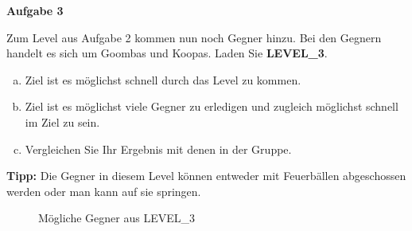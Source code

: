 \documentclass[a4paper,12pt]{article}
\newcommand{\Aufgabe}[1]{
  {
  \textsf{\textbf{Aufgabe #1}}
  
  }
}
\begin{document}
\Aufgabe{3}
Zum Level aus Aufgabe 2 kommen nun noch Gegner hinzu. Bei den Gegnern handelt es sich um Goombas und Koopas. Laden Sie \textbf{\mbox{LEVEL\_3}}.
\begin{enumerate}[a)]
	\item Ziel ist es möglichst schnell durch das Level zu kommen.
	\item Ziel ist es möglichst viele Gegner zu erledigen und zugleich möglichst schnell im Ziel zu sein.
	\item Vergleichen Sie Ihr Ergebnis mit denen in der Gruppe.
\end{enumerate}

\textbf{Tipp:} Die Gegner in diesem Level können entweder mit Feuerbällen abgeschossen werden oder man kann auf sie springen.

\begin{figure}[H]
	\centering
	\hspace{30px}
	\caption{Mögliche Gegner aus \mbox{LEVEL\_3}}
\end{figure}
\end{document}
